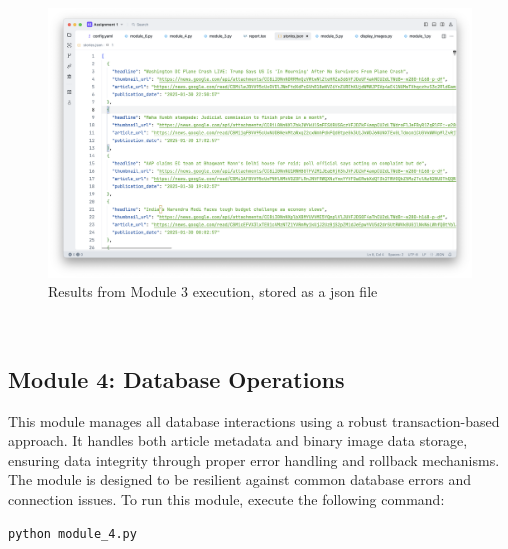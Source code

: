 \documentclass{article}
\begin{document}
\begin{figure}[H]
    \centering
    \includegraphics[width=\textwidth]{report/module_3 results_2.png}
    \caption{Results from Module 3 execution, stored as a json file}
    \label{fig:module3-results-2}
\end{figure}

\\

\subsection{Module 4: Database Operations}
This module manages all database interactions using a robust transaction-based approach. It handles both article metadata and binary image data storage, ensuring data integrity through proper error handling and rollback mechanisms. The module is designed to be resilient against common database errors and connection issues.
To run this module, execute the following command:
\begin{lstlisting}[language=bash]
python module_4.py 
\end{lstlisting}
\end{document}
